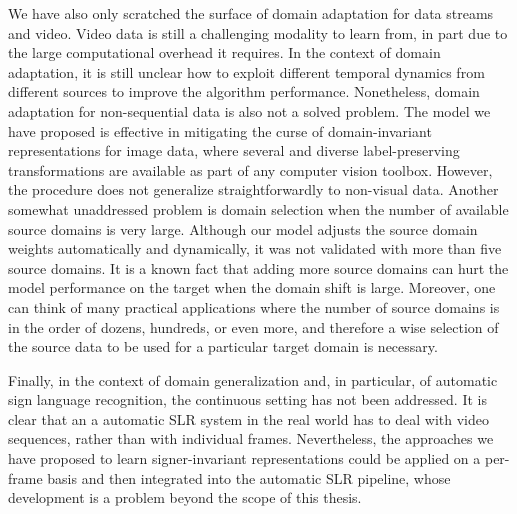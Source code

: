 We have also only scratched the surface of domain adaptation for data streams and video. Video data is still a challenging modality to learn from, in part due to the large computational overhead it requires. In the context of domain adaptation, it is still unclear how to exploit different temporal dynamics from different sources to improve the  algorithm performance. Nonetheless, domain adaptation for non-sequential data is also not a solved problem. The model we have proposed is effective in mitigating the curse of domain-invariant representations for image data, where several and diverse label-preserving transformations are available as part of any computer vision toolbox. However, the procedure does not generalize straightforwardly to non-visual data. Another somewhat unaddressed problem is domain selection when the number of available source domains is very large. Although our model adjusts the source domain weights automatically and dynamically, it was not validated with more than five source domains. It is a known fact that adding more source domains can hurt the model performance on the target when the domain shift is large. Moreover, one can think of many practical applications where the number of source domains is in the order of dozens, hundreds, or even more, and therefore a wise selection of the source data to be used for a particular target domain is necessary.

Finally, in the context of domain generalization and, in particular, of automatic sign language recognition, the continuous setting has not been addressed. It is clear that an a automatic SLR system in the real world has to deal with video sequences, rather than with individual frames. Nevertheless, the approaches we have proposed to learn signer-invariant representations could be applied on a per-frame basis and then integrated into the automatic SLR pipeline, whose development is a problem beyond the scope of this thesis.